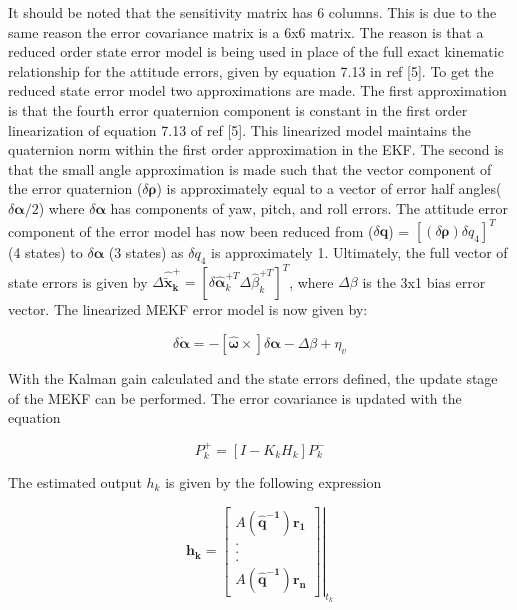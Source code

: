 \documentclass[12pt]{report}
\begin{document}
\noindent It should be noted that the sensitivity matrix has 6 columns. This is due to the same reason the error covariance matrix is a 6x6 matrix. The reason is that a reduced order state error model is being used in place of the full exact kinematic relationship for the attitude errors, given by equation 7.13 in ref [5]. To get the reduced state error model two approximations are made. The first approximation is that the fourth error quaternion component is constant in the first order linearization of equation 7.13 of ref [5]. This linearized model maintains the quaternion norm within the first order approximation in the EKF. The second is that the small angle approximation is made such that the vector component of the error quaternion ($\delta\pmb{\rho}$) is approximately equal to a vector of error half angles($\delta\pmb{\alpha}/2$) where $\delta\pmb{\alpha}$ has components of yaw, pitch, and roll errors. The attitude error component of the error model has now been reduced from ($\delta\pmb{q}$) = $ [(\delta\pmb{\rho}) \delta q_4] ^T$ (4 states) to $\delta\pmb{\alpha}$ (3 states) as $\delta q_4$ is approximately 1. Ultimately, the full vector of state errors is given by $\Delta\pmb{\hat{\tilde{x}}_k^+} = [\delta\pmb{\hat{\alpha}}_k^{+T} \Delta\hat{\beta}_k^{+T}]^T$, where $\Delta\beta$ is the 3x1 bias error vector. The linearized MEKF error model is now given by:

\begin{equation*}
	\delta\dot{\pmb{\alpha}} =-[\hat{\pmb{\omega}}\times]\delta{\pmb{\alpha}} - \Delta\beta+\eta_v
\end{equation*}


\noindent With the Kalman gain calculated and the state errors defined, the update stage of the MEKF can be performed. The error covariance is updated with the equation

\begin{equation}
	P_k^+ =[I - K_kH_k]P_k^-
\end{equation}

\noindent The estimated output $h_k$ is given by the following expression

\begin{equation}
	\pmb{h_k} = \left. \begin{bmatrix}
		A(\pmb{\hat{q}^{-1}})\pmb{r_1} \\
		.  \\
		. \\
		. \\
		A(\pmb{\hat{q}^{-1}})\pmb{r_n}
		
	\end{bmatrix}\right|_{t_k}
\end{equation}
\end{document}
